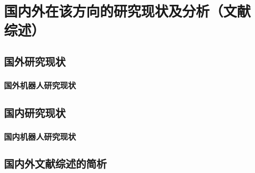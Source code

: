 
\section{国内外在该方向的研究现状及分析（文献综述）}
\subsection{国外研究现状}
\subsubsection{国外机器人研究现状}
\subsection{国内研究现状}
\subsubsection{国内机器人研究现状}

\subsection{国内外文献综述的简析}
